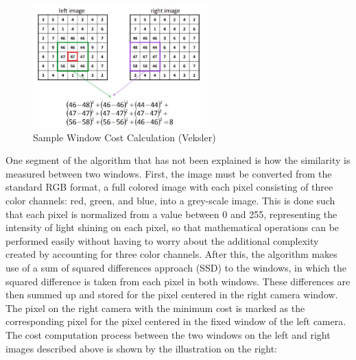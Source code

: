 \documentclass[11pt]{scrartcl}
\begin{document}
\begin{figure}
  \includegraphics[width=0.6\textwidth]{ex.jpg}
  \caption{\label{fig:frog1} Sample Window Cost Calculation (Veksler)}
\end{figure}

One segment of the algorithm that has not been explained is how the similarity is measured between two windows. First, the image must be converted from the standard RGB format, a full colored image with each pixel consisting of three color channels: red, green, and blue,  
into a grey-scale image. This is done such that each pixel is normalized from a value between 0 and 255, representing the intensity of light shining on each pixel, so that mathematical operations can be performed easily without having to worry about the additional complexity created by accounting for three color channels. After this, the algorithm makes use of a sum of squared differences approach (SSD) to the windows, in which the squared difference is taken from each pixel in both windows. These differences are then summed up and stored for the pixel centered in the right camera window. The pixel on the right camera with the minimum cost is marked as the corresponding pixel for the pixel centered in the fixed window of the left camera. The cost computation process between the two windows on the left and right images described above is shown by the illustration on the right: 
\newpage
\end{document}
